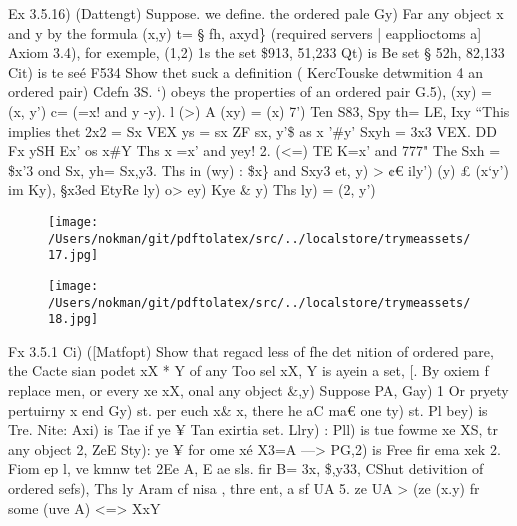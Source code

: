 \documentclass[a4paper,12pt]{article}
\begin{document}
\vspace{10pt}

    Ex 3.5.16) (Dattengt)  Suppose. we define. the ordered pale Gy) Far any object x and y  by the formula (x,y) t= § fh, axyd\} (required servers | eapplioctoms a] Axiom 3.4),  for exemple, (1,2) 1s the set \$913, 51,233  Qt) is Be set § 52h, 82,133  Cit) is te seé F534    Show thet suck a definition ( KercTouske detwmition 4 an ordered pair) Cdefn 3S. ‘)  obeys the properties of an ordered pair G.5), (xy) = (x, y’) c= (=x! and y -y).    l (>)  A (xy) = (x) 7’) Ten S83, Spy th= LE, Ixy  “This implies thet 2x2 = Sx VEX ys = sx ZF sx, y'\$ as x '\#y’  Sxyh = 3x3 VEX. DD Fx ySH Ex’ os x\#Y  Ths x =x’ and yey!    2. (<=)  TE K=x' and 777" The Sxh = \$x'3 ond Sx, yh= Sx,y3.  Ths in (wy) : \$x\} and Sxy3 et, y) > ¢€ ily’) (y) £ (x‘y')  im Ky), §x3ed EtyRe ly) o> ey) Kye \& y)  Ths ly) = (2, y’) 

\vspace{10pt}

\par

\vspace{10pt}

\begin{figure}[h]

\texttt{[image: /Users/nokman/git/pdftolatex/src/../localstore/trymeassets/17.jpg]}

\centering

\end{figure}

\par

\vspace{10pt}

\begin{figure}[h]

\texttt{[image: /Users/nokman/git/pdftolatex/src/../localstore/trymeassets/18.jpg]}

\centering

\end{figure}

\par

\vspace{10pt}

    Fx 3.5.1 Ci) ([Matfopt)  Show that regacd less of fhe det nition of ordered pare,  the Cacte sian podet xX * Y of any Too sel xX, Y is ayein a set,    [. By oxiem f replace men, or every xe xX, onal any object \&,y)    Suppose PA, Gay) 1 Or pryety pertuirny x end Gy) st.  per euch x\& x, there he aC ma€ one ty) st. Pl bey) is Tre.    Nite: Axi) is Tae if ye ¥    Tan exirtia set. Llry) : Pll) is tue fowme xe XS,    tr any object 2,  ZeE Sty): ye ¥ for ome xé X3=A  —> PG,2) is Free fir ema xek    2. Fiom ep l, ve kmnw tet 2Ee A, E ae sls.  fir B= 3x, \$,y33, CShut detivition of ordered sefs),  Ths ly Aram cf nisa , thre ent, a sf UA 5.  ze UA > (ze (x.y) fr some (uve A)  <=> XxY 
\end{document}
